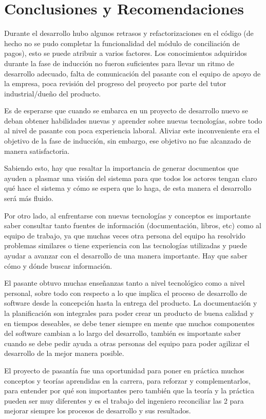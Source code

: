 \chapter*{Conclusiones y Recomendaciones}
Durante el desarrollo hubo algunos retrasos y refactorizaciones en el código (de hecho no se pudo completar la funcionalidad del módulo de conciliación de pagos), esto se puede atribuir a varios factores. Los conocimientos adquiridos durante la fase de inducción no fueron suficientes para llevar un ritmo de desarrollo adecuado, falta de comunicación del pasante con el equipo de apoyo de la empresa, poca revisión del progreso del proyecto por parte del tutor industrial/dueño del producto.

Es de esperarse que cuando se embarca en un proyecto de desarrollo nuevo se deban obtener habilidades nuevas y aprender sobre nuevas tecnologías, sobre todo al nivel de pasante con poca experiencia laboral. Aliviar este inconveniente era el objetivo de la fase de inducción, sin embargo, ese objetivo no fue alcanzado de manera satisfactoria.


Sabiendo esto, hay que resaltar la importancia de generar documentos que ayuden a plasmar una visión del sistema para que todos los actores tengan claro qué hace el sistema y cómo se espera que lo haga, de esta manera el desarrollo será más fluido.


Por otro lado, al enfrentarse con nuevas tecnologías y conceptos es importante saber consultar tanto fuentes de información (documentación, libros, etc) como al equipo de trabajo, ya que muchas veces otra persona del equipo ha resolvido problemas similares o tiene experiencia con las tecnologías utilizadas y puede ayudar a avanzar con el desarrollo de una manera importante. Hay que saber cómo y dónde buscar información.

El pasante obtuvo muchas enseñanzas tanto a nivel tecnológico como a nivel personal, sobre todo con respecto a lo que implica el proceso de desarrollo de software desde la concepción hasta la entrega del producto. La documentación y la planificación son integrales para poder crear un producto de buena calidad y en tiempos deseables, se debe tener siempre en mente que muchos componentes del software cambian a lo largo del desarrollo, también es importante saber cuando se debe pedir ayuda a otras personas del equipo para poder agilizar el desarrollo de la mejor manera posible.

El proyecto de pasantía fue una oportunidad para poner en práctica muchos conceptos y teorías aprendidas en la carrera, para reforzar y complementarlos, para entender por qué son importantes pero también que la teoría y la práctica pueden ser muy diferentes y es el trabajo del ingeniero reconciliar las 2 para mejorar siempre los procesos de desarrollo y sus resultados.

